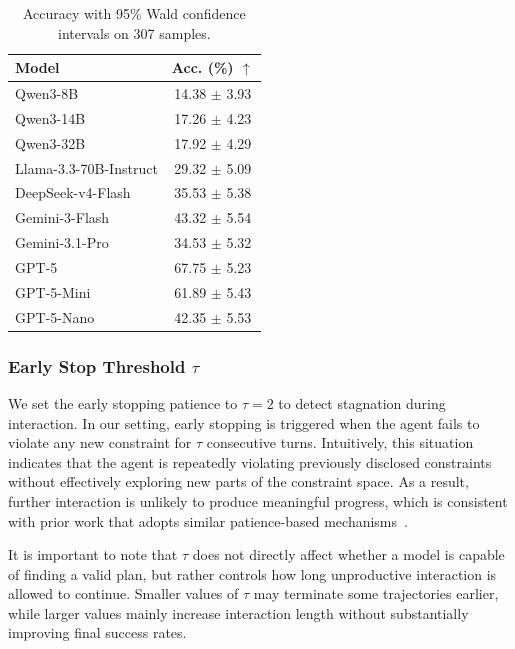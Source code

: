 \documentclass{llmxive}
\begin{document}
\begin{table}[t]
\vspace{-0.5em}
\centering
\small
\begin{tabular}{lc}
\toprule
Model & Acc. (\%) $\uparrow$ \\
\midrule
Qwen3-8B & 14.38 $\pm$ 3.93 \\
Qwen3-14B & 17.26 $\pm$ 4.23 \\
Qwen3-32B & 17.92 $\pm$ 4.29 \\
Llama-3.3-70B-Instruct & 29.32 $\pm$ 5.09 \\
DeepSeek-v4-Flash & 35.53 $\pm$ 5.38 \\
Gemini-3-Flash & 43.32 $\pm$ 5.54 \\
Gemini-3.1-Pro & 34.53 $\pm$ 5.32 \\
GPT-5 & 67.75 $\pm$ 5.23 \\
GPT-5-Mini & 61.89 $\pm$ 5.43 \\
GPT-5-Nano & 42.35 $\pm$ 5.53 \\
\bottomrule
\end{tabular}
\vspace{-0.5em}
\caption{Accuracy with 95\% Wald confidence intervals on 307 samples.}
\label{tab:model_acc_ci}
\vspace{-1em}

\end{table}

\subsubsection{Early Stop Threshold \texorpdfstring{$\tau$}{...}}
\label{app:early-stop-threshold-ablation}

We set the early stopping patience to $\tau = 2$ to detect stagnation during interaction. 
In our setting, early stopping is triggered when the agent fails to violate any new constraint for $\tau$ consecutive turns. 
Intuitively, this situation indicates that the agent is repeatedly violating previously disclosed constraints without effectively exploring new parts of the constraint space. 
As a result, further interaction is unlikely to produce meaningful progress, which is consistent with prior work that adopts similar patience-based mechanisms~\citep{UserBench}.

It is important to note that $\tau$ does not directly affect whether a model is capable of finding a valid plan, but rather controls how long unproductive interaction is allowed to continue. 
Smaller values of $\tau$ may terminate some trajectories earlier, while larger values mainly increase interaction length without substantially improving final success rates.
\end{document}

